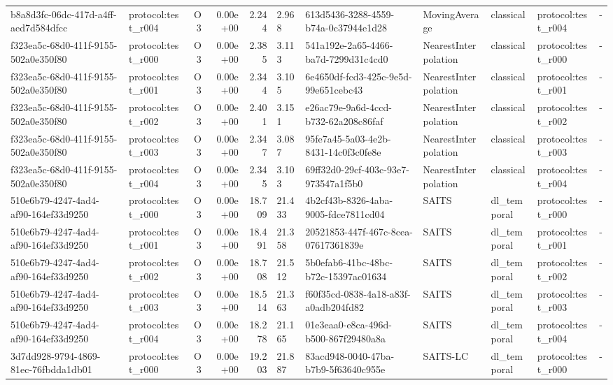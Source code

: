\begin{table}[htbp]
\begin{tabular}{llrrr}
b8a8d3fc-06dc-417d-a4ff-aed7d584dfcc & protocol:test\_r004 & O3 & 0.00e+00 & 2.244 & 2.968 & 613d5436-3288-4559-b74a-0c37944e1d28 & MovingAverage & classical & protocol:test\_r004 & - \\
f323ea5c-68d0-411f-9155-502a0e350f80 & protocol:test\_r000 & O3 & 0.00e+00 & 2.385 & 3.113 & 541a192e-2a65-4466-ba7d-7299d31c4cd0 & NearestInterpolation & classical & protocol:test\_r000 & - \\
f323ea5c-68d0-411f-9155-502a0e350f80 & protocol:test\_r001 & O3 & 0.00e+00 & 2.344 & 3.105 & 6e4650df-fcd3-425c-9e5d-99e651cebc43 & NearestInterpolation & classical & protocol:test\_r001 & - \\
f323ea5c-68d0-411f-9155-502a0e350f80 & protocol:test\_r002 & O3 & 0.00e+00 & 2.401 & 3.151 & e26ac79e-9a6d-4ccd-b732-62a208c86faf & NearestInterpolation & classical & protocol:test\_r002 & - \\
f323ea5c-68d0-411f-9155-502a0e350f80 & protocol:test\_r003 & O3 & 0.00e+00 & 2.347 & 3.087 & 95fe7a45-5a03-4e2b-8431-14c0f3c0fe8e & NearestInterpolation & classical & protocol:test\_r003 & - \\
f323ea5c-68d0-411f-9155-502a0e350f80 & protocol:test\_r004 & O3 & 0.00e+00 & 2.345 & 3.103 & 69ff32d0-29cf-403c-93e7-973547a1f5b0 & NearestInterpolation & classical & protocol:test\_r004 & - \\
510e6b79-4247-4ad4-af90-164ef33d9250 & protocol:test\_r000 & O3 & 0.00e+00 & 18.709 & 21.433 & 4b2cf43b-8326-4aba-9005-fdce7811cd04 & SAITS & dl\_temporal & protocol:test\_r000 & - \\
510e6b79-4247-4ad4-af90-164ef33d9250 & protocol:test\_r001 & O3 & 0.00e+00 & 18.491 & 21.358 & 20521853-447f-467c-8cea-07617361839e & SAITS & dl\_temporal & protocol:test\_r001 & - \\
510e6b79-4247-4ad4-af90-164ef33d9250 & protocol:test\_r002 & O3 & 0.00e+00 & 18.708 & 21.512 & 5b0efab6-41bc-48bc-b72c-15397ac01634 & SAITS & dl\_temporal & protocol:test\_r002 & - \\
510e6b79-4247-4ad4-af90-164ef33d9250 & protocol:test\_r003 & O3 & 0.00e+00 & 18.514 & 21.363 & f60f35cd-0838-4a18-a83f-a0adb204fd82 & SAITS & dl\_temporal & protocol:test\_r003 & - \\
510e6b79-4247-4ad4-af90-164ef33d9250 & protocol:test\_r004 & O3 & 0.00e+00 & 18.278 & 21.165 & 01e3eaa0-e8ca-496d-b500-867f29480a8a & SAITS & dl\_temporal & protocol:test\_r004 & - \\
3d7dd928-9794-4869-81ec-76fbdda1db01 & protocol:test\_r000 & O3 & 0.00e+00 & 19.203 & 21.887 & 83acd948-0040-47ba-b7b9-5f63640c955e & SAITS-LC & dl\_temporal & protocol:test\_r000 & - \\

\end{tabular}
\end{table}
